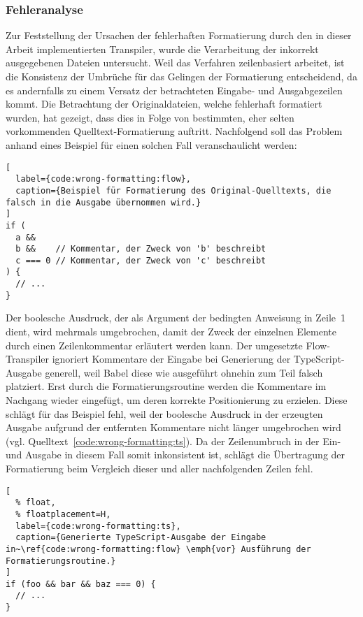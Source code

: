 \subsubsection{Fehleranalyse}

Zur Feststellung der Ursachen der fehlerhaften Formatierung durch den in dieser Arbeit implementierten Transpiler, wurde die Verarbeitung der inkorrekt ausgegebenen Dateien untersucht. Weil das Verfahren zeilenbasiert arbeitet, ist die Konsistenz der Umbrüche für das Gelingen der Formatierung entscheidend, da es andernfalls zu einem Versatz der betrachteten Eingabe- und Ausgabgezeilen kommt. Die Betrachtung der Originaldateien, welche fehlerhaft formatiert wurden, hat gezeigt, dass dies in Folge von bestimmten, eher selten vorkommenden Quelltext-Formatierung auftritt. Nachfolgend soll das Problem anhand eines Beispiel für einen solchen Fall veranschaulicht werden:

\begin{lstlisting}[
  label={code:wrong-formatting:flow},
  caption={Beispiel für Formatierung des Original-Quelltexts, die falsch in die Ausgabe übernommen wird.}
]
if (
  a &&
  b &&    // Kommentar, der Zweck von 'b' beschreibt
  c === 0 // Kommentar, der Zweck von 'c' beschreibt
) {
  // ...
}
\end{lstlisting}

Der boolesche Ausdruck, der als Argument der bedingten Anweisung in Zeile~1 dient, wird mehrmals umgebrochen, damit der Zweck der einzelnen Elemente durch einen Zeilenkommentar erläutert werden kann. Der umgesetzte Flow-Transpiler ignoriert Kommentare der Eingabe bei Generierung der TypeScript-Ausgabe generell, weil Babel diese wie ausgeführt ohnehin zum Teil falsch platziert. Erst durch die Formatierungsroutine werden die Kommentare im Nachgang wieder eingefügt, um deren korrekte Positionierung zu erzielen. Diese schlägt für das Beispiel fehl, weil der boolesche Ausdruck in der erzeugten Ausgabe aufgrund der entfernten Kommentare nicht länger umgebrochen wird (vgl. Quelltext~\ref{code:wrong-formatting:ts}). Da der Zeilenumbruch in der Ein- und Ausgabe in diesem Fall somit inkonsistent ist, schlägt die Übertragung der Formatierung beim Vergleich dieser und aller nachfolgenden Zeilen fehl.

\begin{lstlisting}[
  % float,
  % floatplacement=H,
  label={code:wrong-formatting:ts},
  caption={Generierte TypeScript-Ausgabe der Eingabe in~\ref{code:wrong-formatting:flow} \emph{vor} Ausführung der Formatierungsroutine.}
]
if (foo && bar && baz === 0) {
  // ...
}
\end{lstlisting}

